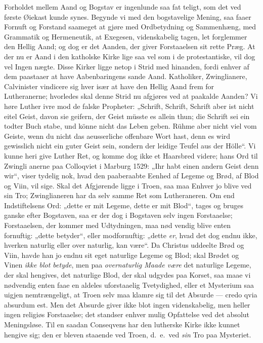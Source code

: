 \documentclass[12pt,a4paper]{article}
\newcommand{\opage}[1]{\marginnote{\footnotesize\textit{[#1]}}}
\begin{document}
Forholdet mellem Aand og Bogstav er ingenlunde saa fat\-%
teligt, som det ved første Øiekast kunde synes. Begynde vi med
den bogstavelige Mening, saa faaer Fornuft og Forstand saameget
at gjøre med Ordbetydning og Sammenhæng, med Grammatik og
Hermeneutik, at Exegesen, videnskabelig tagen, let forglemmer den
\opage{21}Hellig Aand; og dog er det Aanden, der giver Forstaaelsen sit
rette Præg. At der nu er Aand i den katholske Kirke lige saa
vel som i de protestantiske, vil dog vel Ingen nægte. Disse Kirker
ligge netop i Strid med hinanden, fordi enhver af dem paastaaer
at have Aabenbaringens sande Aand. Katholiker, Zwinglianere,
Calvinister vindicere sig hver især at have den Hellig Aand frem\-%
for Lutheranerne; hvorledes skal denne Strid nu afgjøres ved at
paakalde Aanden? Vi høre Luther ivre mod de falske Propheter:
„Schrift, Schrift, Schrift aber ist nicht eitel Geist, davon sie geifern,
der Geist müsste es allein thun; die Schrift sei ein todter Buch\-%
stabe, und könne nicht das Leben geben. Rühme aber nicht viel
vom Geiste, wenn du nicht das aeusserliche offenbare Wort hast,
denn es wird gewisslich nicht ein guter Geist sein, sondern der
leidige Teufel aus der Hölle“. Vi kunne heri give Luther Ret,
og komme dog ikke et Haarsbred videre; hans Ord til Zwingli\-%
anerne paa Colloqviet i Marburg 1529: „Ihr habt einen andern
Geist denn wir“, viser tydelig nok, hvad den paaberaabte Eenhed af
Legeme og Brød, af Blod og Viin, vil sige. Skal det Afgjørende ligge
i Troen, saa maa Enhver jo blive ved sin Tro; Zwinglianeren har
da selv samme Ret som Lutheraneren. Om end Indstiftelsens
Ord: „dette er mit Legeme, dette er mit Blod“, tages og bruges
ganske efter Bogstaven, saa er der dog i Bogstaven selv ingen
Forstaaelse; Forstaaelsen, der kommer med Udtydningen, maa nød\-%
vendig blive enten fornuftig: „dette betyder“, eller modfornuftig:
„dette \emph{er}, hvad det dog endnu ikke, hverken naturlig eller over\-%
naturlig, kan være“. Da Christus uddeelte Brød og Viin, havde
han jo endnu sit eget naturlige Legeme og Blod; skal Brødet og
Vinen \emph{ikke blot betyde}, men paa \emph{overnaturlig Maade
være} det naturlige Legeme, der skal hengives, det naturlige Blod,
der skal udgydes paa Korset, saa maae vi nødvendig enten faae
en aldeles uforstaaelig Tvetydighed, eller et Mysterium saa uigjen\-%
nemtrængeligt, at Troen selv maa klamre sig til det Absurde ---
credo qvia absurdum est. Men det Absurde giver ikke blot ingen
videnskabelig, men heller ingen religiøs Forstaaelse; det standser
enhver mulig Opfattelse ved det absolut Meningsløse. Til en
\opage{22}saadan Conseqvens har den lutherske Kirke ikke kunnet hengive
sig; den er bleven staaende ved Troen, d.\ e.\ ved \emph{sin} Tro paa
Mysteriet.
\end{document}
